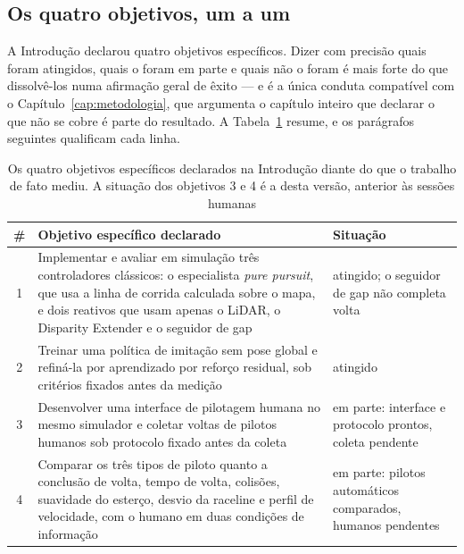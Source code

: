 \subsection*{Os quatro objetivos, um a um}

A Introdução declarou quatro objetivos específicos. Dizer com precisão quais foram
atingidos, quais o foram em parte e quais não o foram é mais forte do que
dissolvê-los numa afirmação geral de êxito --- e é a única conduta compatível
com o Capítulo~\ref{cap:metodologia}, que argumenta o capítulo inteiro que
declarar o que não se cobre é parte do resultado. A
Tabela~\ref{tab:conc_objetivos} resume, e os parágrafos seguintes qualificam cada
linha.

\begin{table}[h]
    \centering
    \small
    \begin{tabularx}{\textwidth}{|c|>{\raggedright\arraybackslash}X|>{\raggedright\arraybackslash}p{3.3cm}|}
        \hline
        \textbf{\#} & \textbf{Objetivo específico declarado} & \textbf{Situação} \\
        \hline
        1 & Implementar e avaliar em simulação três controladores clássicos: o
        especialista \textit{pure pursuit}, que usa a linha de corrida calculada
        sobre o mapa, e dois reativos que usam apenas o LiDAR, o Disparity
        Extender e o seguidor de gap &
        atingido; o seguidor de gap não completa volta \\
        \hline
        2 & Treinar uma política de imitação sem pose global e refiná-la por
        aprendizado por reforço residual, sob critérios fixados antes da
        medição & atingido \\
        \hline
        3 & Desenvolver uma interface de pilotagem humana no mesmo simulador e
        coletar voltas de pilotos humanos sob protocolo fixado antes da coleta
        & em parte: interface e protocolo prontos, coleta pendente \\
        \hline
        4 & Comparar os três tipos de piloto quanto a conclusão de volta, tempo de
        volta, colisões, suavidade do esterço, desvio da raceline e perfil de
        velocidade, com o humano em duas condições de informação & em parte:
        pilotos automáticos comparados, humanos pendentes \\
        \hline
    \end{tabularx}
    \caption{Os quatro objetivos específicos declarados na Introdução diante do
    que o trabalho de fato mediu. A situação dos objetivos 3 e 4 é a desta
    versão, anterior às sessões humanas}
    \label{tab:conc_objetivos}
\end{table}

